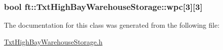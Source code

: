 \subsubsection[{\texorpdfstring{wpc}{wpc}}]{\setlength{\rightskip}{0pt plus 5cm}bool ft\+::\+Txt\+High\+Bay\+Warehouse\+Storage\+::wpc\mbox{[}3\mbox{]}\mbox{[}3\mbox{]}\hspace{0.3cm}{\ttfamily [protected]}}\hypertarget{classft_1_1_txt_high_bay_warehouse_storage_a0a570d0460997c823a04d990f08fae6f}{}\label{classft_1_1_txt_high_bay_warehouse_storage_a0a570d0460997c823a04d990f08fae6f}


The documentation for this class was generated from the following file\+:\begin{DoxyCompactItemize}
\item 
\hyperlink{_txt_high_bay_warehouse_storage_8h}{Txt\+High\+Bay\+Warehouse\+Storage.\+h}\end{DoxyCompactItemize}
